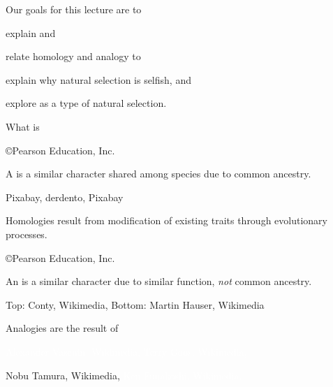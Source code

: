 \documentclass[t,handout]{beamer}  %
\begin{document}
%

\begin{frame}{Our goals for this lecture are to }
	
	\hangpara explain  and 
	
	\hangpara relate homology and analogy to 

	\hangpara explain why natural selection is selfish, and
	
	
	\hangpara explore  as a type of natural selection.

\end{frame}
%
{
\begin{frame}[b]{What is }

	\hfill \tiny \copyright Pearson Education, Inc.

\end{frame}
}
%
{
\begin{frame}[b]{A  is a similar character shared among species due to common ancestry.}

	\vfilll

	\tiny Pixabay, \cc \hfill derdento, Pixabay \cc

\end{frame}
}
%
{
\begin{frame}[t]{Homologies result from modification of existing traits through evolutionary processes.}

	\vfilll

	\hfill \tiny \copyright Pearson Education, Inc.

\end{frame}
}
%
{
\begin{frame}[b]{An  is a similar character due to similar function, \emph{not} common ancestry.}


\tiny Top: Conty, Wikimedia,  \hfill Bottom: Martin Hauser, Wikimedia 
\end{frame}
}
%
{
\begin{frame}[t]{Analogies are the result of }

	\vspace{3.85cm}

	\tiny \textcolor{white}{Alexander Vasenin, Wikimedia, 
	\hfill Terry Goos, Wikimedia, }

	\vfilll

	\tiny Nobu Tamura, Wikimedia,  \hfill \textcolor{white}{Ken Funakoshi, Wikimedia, }

\end{frame}
}
\end{document}
